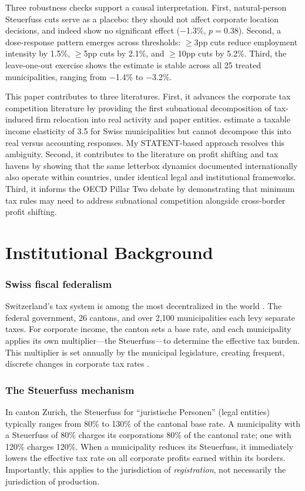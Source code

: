 \documentclass[12pt]{article}
\begin{document}
Three robustness checks support a causal interpretation. First, natural-person Steuerfuss cuts serve as a placebo: they should not affect corporate location decisions, and indeed show no significant effect ($-$1.3\%, $p = 0.38$). Second, a dose-response pattern emerges across thresholds: $\geq$3pp cuts reduce employment intensity by 1.5\%, $\geq$5pp cuts by 2.1\%, and $\geq$10pp cuts by 5.2\%. Third, the leave-one-out exercise shows the estimate is stable across all 25 treated municipalities, ranging from $-$1.4\% to $-$3.2\%.

This paper contributes to three literatures. First, it advances the corporate tax competition literature \citep{devereux2008business, slemrod2004tax} by providing the first subnational decomposition of tax-induced firm relocation into real activity and paper entities. \citet{krapf2021taxincidence} estimate a taxable income elasticity of 3.5 for Swiss municipalities but cannot decompose this into real versus accounting responses. My STATENT-based approach resolves this ambiguity. Second, it contributes to the literature on profit shifting and tax havens \citep{torslov2023missing, dharmapala2008what} by showing that the same letterbox dynamics documented internationally also operate within countries, under identical legal and institutional frameworks. Third, it informs the OECD Pillar Two debate \citep{oecd2021pillartwo} by demonstrating that minimum tax rules may need to address subnational competition alongside cross-border profit shifting.

\section{Institutional Background}

\subsubsection*{Swiss fiscal federalism} Switzerland's tax system is among the most decentralized in the world \citep{oates1972fiscal, agrawal2021fiscal}. The federal government, 26 cantons, and over 2,100 municipalities each levy separate taxes. For corporate income, the canton sets a base rate, and each municipality applies its own multiplier---the Steuerfuss---to determine the effective tax burden. This multiplier is set annually by the municipal legislature, creating frequent, discrete changes in corporate tax rates \citep{brulhart2012agglomeration}.

\subsubsection*{The Steuerfuss mechanism} In canton Zurich, the Steuerfuss for ``juristische Personen'' (legal entities) typically ranges from 80\% to 130\% of the cantonal base rate. A municipality with a Steuerfuss of 80\% charges its corporations 80\% of the cantonal rate; one with 120\% charges 120\%. When a municipality reduces its Steuerfuss, it immediately lowers the effective tax rate on all corporate profits earned within its borders. Importantly, this applies to the jurisdiction of \textit{registration}, not necessarily the jurisdiction of production.
\end{document}

